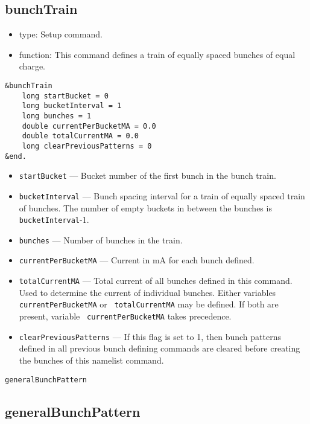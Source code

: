 \documentclass[11pt]{article}
\begin{document}
\subsection{bunchTrain}

\begin{itemize}
\item type: Setup command. 
\item function: This command defines a train of equally spaced bunches of equal charge.
\end{itemize}
\begin{verbatim}
&bunchTrain
    long startBucket = 0
    long bucketInterval = 1
    long bunches = 1
    double currentPerBucketMA = 0.0
    double totalCurrentMA = 0.0
    long clearPreviousPatterns = 0
&end.
\end{verbatim}
\begin{itemize}
\item {\tt startBucket} --- Bucket number of the first bunch in the bunch train.
\item {\tt bucketInterval} --- Bunch spacing interval for a train of equally spaced train of bunches.
The number of empty buckets in between the bunches is {\tt bucketInterval}-1.
\item {\tt bunches} --- Number of bunches in the train.
\item {\tt currentPerBucketMA} --- Current in mA for each bunch defined.
\item {\tt totalCurrentMA} --- Total current of all bunches defined
in this command. Used to determine the current of individual
bunches. Either variables {\tt currentPerBucketMA} or {\tt
totalCurrentMA} may be defined.  If both are present, variable {\tt
currentPerBucketMA} takes precedence.
\item {\tt clearPreviousPatterns} --- If this flag is set to 1, then
bunch patterns defined in all previous bunch defining commands are
cleared before creating the bunches of this namelist command.
\end{itemize}

\newpage
\begin{center}\tt generalBunchPattern\end{center}
\subsection{generalBunchPattern}
\end{document}
